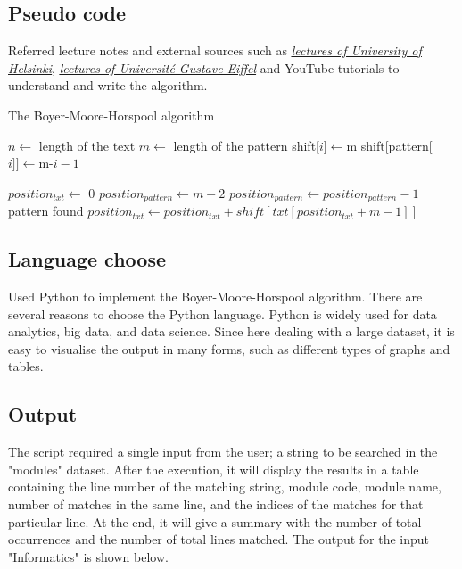 \documentclass[12pt]{article}
\begin{document}
\subsection{Pseudo code}
Referred lecture notes and external sources such as \textit{\underline{ \href{https://www.cs.helsinki.fi/u/tpkarkka/teach/14-15/SPA/lecture05-2x4.pdf}{lectures of University of Helsinki}}}, \textit{\underline{\href{https://www-igm.univ-mlv.fr/~lecroq/string/node18.html}{lectures of Université Gustave Eiffel}}} and YouTube tutorials to understand and write the algorithm.
\begin{algorithm}
	\caption{The Boyer-Moore-Horspool algorithm}
	\begin{algorithmic}[1]
    	    \State $n \leftarrow$ length of the text
    	    \State $m \leftarrow$ length of the pattern
    		    \State shift[$i]\leftarrow$m
    	    \EndFor
    		    \State shift[pattern[$i]]\leftarrow$m-$i-1$
    	    \EndFor

    	    \State $position_{txt} \leftarrow$ 0
    	            \State $position_{pattern} \leftarrow m -2$
                        \State $position_{pattern} \leftarrow position_{pattern} - 1$
    	                \State pattern found
    	            \EndIf
                    \EndWhile
    	        \EndIf
    	        \State $position_{txt} \leftarrow position_{txt} + shift[txt[position_{txt} + m - 1]]$
    	    \EndWhile
    	\EndFunction
	\end{algorithmic}
\end{algorithm}

\newpage

\subsection{Language choose}
Used Python to implement the Boyer-Moore-Horspool algorithm. There are several reasons to choose the Python language. Python is widely used for data analytics, big data, and data science. Since here dealing with a large dataset, it is easy to visualise the output in many forms, such as different types of graphs and tables.

\subsection{Output}
The script required a single input from the user; a string to be searched in the "modules" dataset. After the execution, it will display the results in a table containing the line number of the matching string, module code, module name, number of matches in the same line, and the indices of the matches for that particular line. At the end, it will give a summary with the number of total occurrences and the number of total lines matched. The output for the input "Informatics" is shown below.
\end{document}
